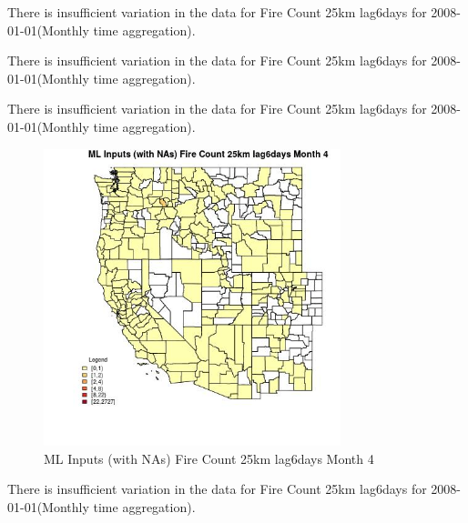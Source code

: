 There is insufficient variation in the data for Fire Count 25km lag6days for 2008-01-01(Monthly time aggregation). 
 

There is insufficient variation in the data for Fire Count 25km lag6days for 2008-01-01(Monthly time aggregation). 
 

There is insufficient variation in the data for Fire Count 25km lag6days for 2008-01-01(Monthly time aggregation). 
 

\begin{figure} 
\centering  
\includegraphics[width=0.77\textwidth]{Code_Outputs/Report_ML_input_PM25_Step4_part_f_de_duplicated_aves_prioritize_24hr_obswNAs_CountyFire_Count_25km_lag6daysmedianMonth4.jpg} 
\caption{\label{fig:Report_ML_input_PM25_Step4_part_f_de_duplicated_aves_prioritize_24hr_obswNAsCountyFire_Count_25km_lag6daysmedianMonth4}ML Inputs (with NAs) Fire Count 25km lag6days Month 4} 
\end{figure} 
 

There is insufficient variation in the data for Fire Count 25km lag6days for 2008-01-01(Monthly time aggregation). 
 

